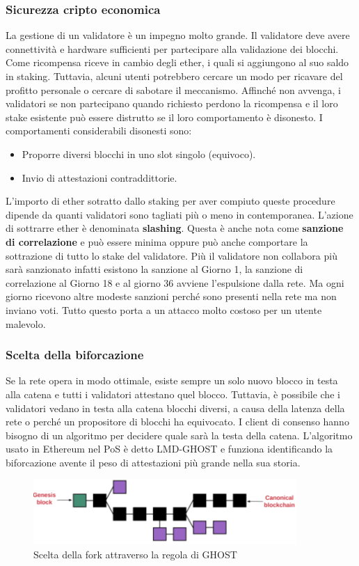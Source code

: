 \documentclass[a4paper,11pt]{report}
\begin{document}
\subsubsection{Sicurezza cripto economica}
La gestione di un validatore è un impegno molto grande. Il validatore deve avere connettività e hardware sufficienti per partecipare alla validazione dei blocchi. Come ricompensa  riceve in cambio degli ether, i quali si aggiungono al suo saldo in staking. Tuttavia, alcuni utenti potrebbero cercare un modo per ricavare del profitto personale o cercare di sabotare il meccanismo. Affinché non avvenga, i validatori se non partecipano quando richiesto perdono la ricompensa e il loro stake esistente può essere distrutto se il loro comportamento è disonesto. I comportamenti considerabili disonesti sono: 
\begin{itemize}
\item Proporre diversi blocchi in uno slot singolo (equivoco).
\item Invio di attestazioni contraddittorie. 
\end{itemize}
L'importo di ether sotratto dallo staking per aver compiuto queste procedure dipende da quanti validatori sono tagliati più o meno in contemporanea. L'azione di sottrarre ether è denominata \textbf{slashing}. Questa è anche nota come \textbf{sanzione di correlazione} e può essere minima oppure può anche comportare la sottrazione di tutto lo stake del validatore. Più il validatore non collabora più sarà sanzionato infatti esistono la sanzione al Giorno 1, la sanzione di correlazione al Giorno 18 e al giorno 36 avviene l'espulsione dalla rete. Ma ogni giorno ricevono altre modeste sanzioni perché sono presenti nella rete ma non inviano voti. Tutto questo porta a un attacco molto costoso per un utente malevolo.

\newpage
\subsubsection{Scelta della biforcazione}
Se la rete opera in modo ottimale, esiste sempre un solo nuovo blocco in testa alla catena e tutti i validatori attestano quel blocco. Tuttavia, è possibile che i validatori vedano in testa alla catena blocchi diversi, a causa della latenza della rete o perché un propositore di blocchi ha equivocato. I client di consenso hanno bisogno di un algoritmo per decidere quale sarà la testa della catena. L'algoritmo usato in Ethereum nel PoS è detto LMD-GHOST e funziona identificando la biforcazione avente il peso di attestazioni più grande nella sua storia.
\begin{figure}[htbp] 
\begin{center}
\includegraphics[width=10cm]{img/ghs.png}
\end{center}
\caption{Scelta della fork attraverso la regola di GHOST}
\end{figure}
\end{document}
